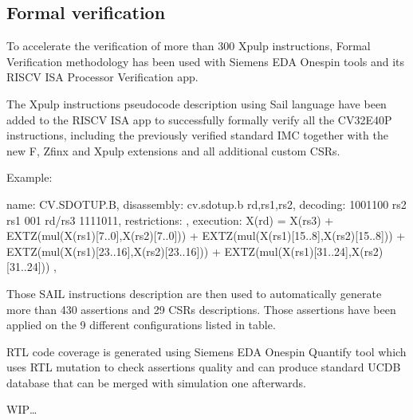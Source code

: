 \documentclass[letterpaper,10pt,english]{sphinxmanual}
\begin{document}
\subsection{Formal verification}
\label{\detokenize{verification:formal-verification}}
\sphinxAtStartPar
To accelerate the verification of more than 300 Xpulp instructions, Formal Verification methodology has been used with Siemens EDA Onespin tools and its RISC\sphinxhyphen{}V ISA Processor Verification app.

\sphinxAtStartPar
The Xpulp instructions pseudo\sphinxhyphen{}code description using Sail language have been added to the RISC\sphinxhyphen{}V ISA app to successfully formally verify all the CV32E40P instructions, including the previously verified standard IMC together with the new F, Zfinx and Xpulp extensions and all additional custom CSRs.

\sphinxAtStartPar
Example:

\begin{sphinxVerbatim}[commandchars=\\\{\}]
\PYGZob{}
  \PYGZdq{}name\PYGZdq{}: \PYGZdq{}CV.SDOTUP.B\PYGZdq{},
  \PYGZdq{}disassembly\PYGZdq{}: \PYGZdq{}cv.sdotup.b \PYGZob{}rd\PYGZcb{},\PYGZob{}rs1\PYGZcb{},\PYGZob{}rs2\PYGZcb{}\PYGZdq{},
  \PYGZdq{}decoding\PYGZdq{}: \PYGZdq{}1001100 rs2 rs1 001 rd/rs3 1111011\PYGZdq{},
  \PYGZdq{}restrictions\PYGZdq{}: \PYGZdq{}\PYGZdq{},
  \PYGZdq{}execution\PYGZdq{}: \PYGZdq{}X(rd) = X(rs3) + EXTZ(mul(X(rs1)[7..0],X(rs2)[7..0])) +
                                 EXTZ(mul(X(rs1)[15..8],X(rs2)[15..8])) +
                                 EXTZ(mul(X(rs1)[23..16],X(rs2)[23..16])) +
                                 EXTZ(mul(X(rs1)[31..24],X(rs2)[31..24]))\PYGZdq{}
\PYGZcb{},
\end{sphinxVerbatim}

\sphinxAtStartPar
Those SAIL instructions description are then used to automatically generate more than 430 assertions and 29 CSRs descriptions.
Those assertions have been applied on the 9 different configurations listed in {\hyperref[\detokenize{verification:verified-configurations}]{}} table.

\sphinxAtStartPar
RTL code coverage is generated using Siemens EDA Onespin Quantify tool which uses RTL mutation to check assertions quality and can produce standard UCDB database that can be merged with simulation one afterwards.

\sphinxAtStartPar
WIP…
\end{document}
